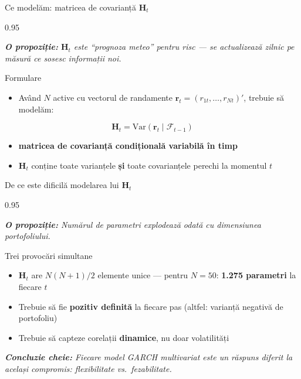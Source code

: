 \documentclass[9pt, aspectratio=169, t]{beamer}
\begin{document}
\begin{frame}{Ce modelăm: matricea de covarianță $\mathbf{H}_t$}
    \begin{cminipage}{0.95\textwidth}
    {\footnotesize
    \textit{\textbf{O propoziție:} $\mathbf{H}_t$ este ``prognoza meteo'' pentru risc --- se actualizează zilnic pe măsură ce sosesc informații noi.}
    \vspace{0.2cm}
    \begin{block}{Formulare}
        \begin{itemize}\setlength{\itemsep}{2pt}
            \item Având $N$ active cu vectorul de randamente $\mathbf{r}_t = (r_{1t}, \ldots, r_{Nt})'$, trebuie să modelăm:
        \end{itemize}
        \[
            \mathbf{H}_t = \text{Var}(\mathbf{r}_t \mid \mathcal{F}_{t-1})
        \]
        \begin{itemize}\setlength{\itemsep}{2pt}
            \item \textbf{matricea de covarianță condițională variabilă în timp}
            \item $\mathbf{H}_t$ conține toate varianțele \textbf{și} toate covarianțele perechi la momentul $t$
        \end{itemize}
    \end{block}
    }
    \end{cminipage}
\end{frame}

\begin{frame}{De ce este dificilă modelarea lui $\mathbf{H}_t$}
    \begin{cminipage}{0.95\textwidth}
    {\footnotesize
    \textit{\textbf{O propoziție:} Numărul de parametri explodează odată cu dimensiunea portofoliului.}
    \vspace{0.2cm}
    \begin{alertblock}{Trei provocări simultane}
        \begin{itemize}\setlength{\itemsep}{3pt}
            \item $\mathbf{H}_t$ are $N(N+1)/2$ elemente unice --- pentru $N = 50$: \textbf{1.275 parametri} la fiecare $t$
            \item Trebuie să fie \textbf{pozitiv definită} la fiecare pas (altfel: varianță negativă de portofoliu)
            \item Trebuie să capteze corelații \textbf{dinamice}, nu doar volatilități
        \end{itemize}
    \end{alertblock}
    \vspace{0.2cm}
    \textit{\textbf{Concluzie cheie:} Fiecare model GARCH multivariat este un răspuns diferit la același compromis: flexibilitate vs.\ fezabilitate.}
    }
    \end{cminipage}
\end{frame}
\end{document}
